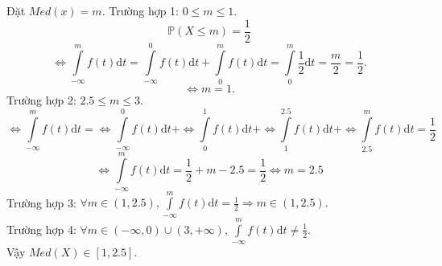 \documentclass[12pt,a4paper]{article}
\begin{document}
Đặt $Med \left( x \right) = m.$
Trường hợp 1: $0 \leqslant m \leqslant 1.$
$$\mathbb{P}\left( {X \leqslant m} \right) = \frac{1}{2}$$
$$ \Leftrightarrow \int\limits_{ - \infty }^m {f\left( t \right)\mathrm{d}t}  = \int\limits_{ - \infty }^0 {f\left( t \right)\mathrm{d}t}  + \int\limits_0^m {f\left( t \right)\mathrm{d}t}  = \int\limits_0^m {\frac{1}{2}\mathrm{d}t}  = \frac{m}{2} = \frac{1}{2}.$$
$$ \Leftrightarrow m = 1.$$
Trường hợp 2: $2.5 \leqslant m \leqslant 3.$
$$ \Leftrightarrow \int\limits_{ - \infty }^m {f\left( t \right)\mathrm{d}t}  =  \Leftrightarrow \int\limits_{ - \infty }^0 {f\left( t \right)\mathrm{d}t}  +  \Leftrightarrow \int\limits_0^1 {f\left( t \right)\mathrm{d}t}  +  \Leftrightarrow \int\limits_1^{2.5} {f\left( t \right)\mathrm{d}t}  +  \Leftrightarrow \int\limits_{2.5}^m {f\left( t \right)\mathrm{d}t = \frac{1}{2}} $$
$$ \Leftrightarrow \int\limits_{ - \infty }^m {f\left( t \right)\mathrm{d}t}  = \frac{1}{2} + m - 2.5 = \frac{1}{2} \Leftrightarrow m = 2.5$$
Trường hợp 3: $\forall m \in \left( {1,2.5} \right),\int\limits_{ - \infty }^m {f\left( t \right)\mathrm{d}t}  = \frac{1}{2} \Rightarrow m \in \left( {1,2.5} \right).$\\
Trường hợp 4: $\forall m \in \left( { - \infty ,0} \right) \cup \left( {3, + \infty } \right),\int\limits_{ - \infty }^m {f\left( t \right)\mathrm{d}t}  \ne \frac{1}{2}.$\\
Vậy $Med\left( X \right) \in \left[ {1,2.5} \right].$
\end{document}
